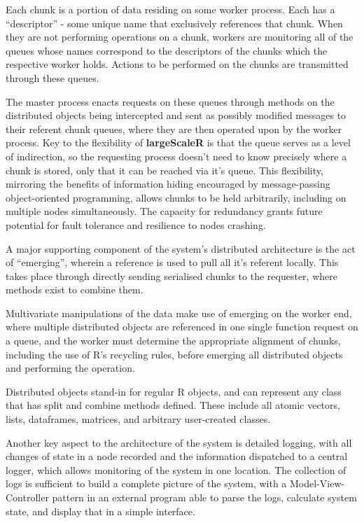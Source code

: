 Each chunk is a portion of data residing on some worker process.
Each has a ``descriptor'' - some unique name that exclusively references that chunk.
When they are not performing operations on a chunk, workers are monitoring all of the queues whose names correspond to the descriptors of the chunks which the respective worker holds.
Actions to be performed on the chunks are transmitted through these queues.

The master process enacts requests on these queues through methods on the distributed objects being intercepted and sent as possibly modified messages to their referent chunk queues, where they are then operated upon by the worker process.
Key to the flexibility of \textbf{largeScaleR} is that the queue serves as a level of indirection, so the requesting process doesn't need to know precisely where a chunk is stored, only that it can be reached via it's queue.
This flexibility, mirroring the benefits of information hiding encouraged by message-passing object-oriented programming, allows chunks to be held arbitrarily, including on multiple nodes simultaneously.
The capacity for redundancy grants future potential for fault tolerance and resilience to nodes crashing.

A major supporting component of the system's distributed architecture is the act of ``emerging'', wherein a reference is used to pull all it's referent locally\cite{emmerich2000engineering}.
This takes place through directly sending serialised chunks to the requester, where methods exist to combine them.

Multivariate manipulations of the data make use of emerging on the worker end, where multiple distributed objects are referenced in one single function request on a queue, and the worker must determine the appropriate alignment of chunks, including the use of R's recycling rules, before emerging all distributed objects and performing the operation.

Distributed objects stand-in for regular R objects, and can represent any class that has split and combine methods defined.
These include all atomic vectors, lists, dataframes, matrices, and arbitrary user-created classes.

Another key aspect to the architecture of the system is detailed logging, with all changes of state in a node recorded and the information dispatched to a central logger, which allows monitoring of the system in one location. The collection of logs is sufficient to build a complete picture of the system, with a Model-View-Controller pattern in an external program able to parse the logs, calculate system state, and display that in a simple interface\cite{gamma1995design}.

